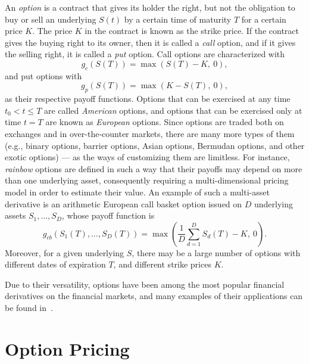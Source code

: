 \documentclass{UUThesisTemplate}
\begin{document}
\par
An \emph{option} is a contract that gives its holder the right, but not the obligation to buy or sell an underlying $S(t)$ by a certain time of maturity $T$ for a certain price $K$. The price $K$ in the contract is known as the strike price. If the contract gives the buying right to its owner, then it is called a \emph{call} option, and if it gives the selling right, it is called a \emph{put} option. Call options are characterized with 
\begin{equation}
\label{eq:callop}
g_c(S(T))=\max(S(T)-K,\ 0),
\end{equation}
and put options with 
\begin{equation}
\label{eq:putop}
g_p(S(T))=\max(K-S(T),\ 0),
\end{equation}
as their respective payoff functions. Options that can be exercised at any time $t_0 < t \leq T$ are called \emph{American} options, and options that can be exercised only at time $t=T$ are known as \emph{European} options. Since options are traded both on exchanges and in over-the-counter markets, there are many more types of them (e.g., binary options, barrier options, Asian options, Bermudan options, and other exotic options) --- as the ways of customizing them are limitless. For instance, \emph{rainbow} options are defined in such a way that their payoffs may depend on more than one underlying asset, consequently requiring a multi-dimensional pricing model in order to estimate their value. An example of such a multi-asset derivative is an arithmetic European call basket option issued on $D$ underlying assets $S_1,\ldots,S_D$, whose payoff function is 
\begin{equation}
\label{eq:basketop}
g_{cb}(S_1(T),\ldots,S_D(T)) = \max\left(\frac{1}{D}\sum_{d=1}^D S_d(T) - K,\ 0\right).
\end{equation}
Moreover, for a given underlying $S$, there may be a large number of options with different dates of expiration $T$, and different strike prices $K$.

\par
Due to their versatility, options have been among the most popular financial derivatives on the financial markets, and many examples of their applications can be found in~\cite{hull2017options}.
%
%





%
\chapter{Option Pricing}
\label{ch:optionpricing}
\end{document}
